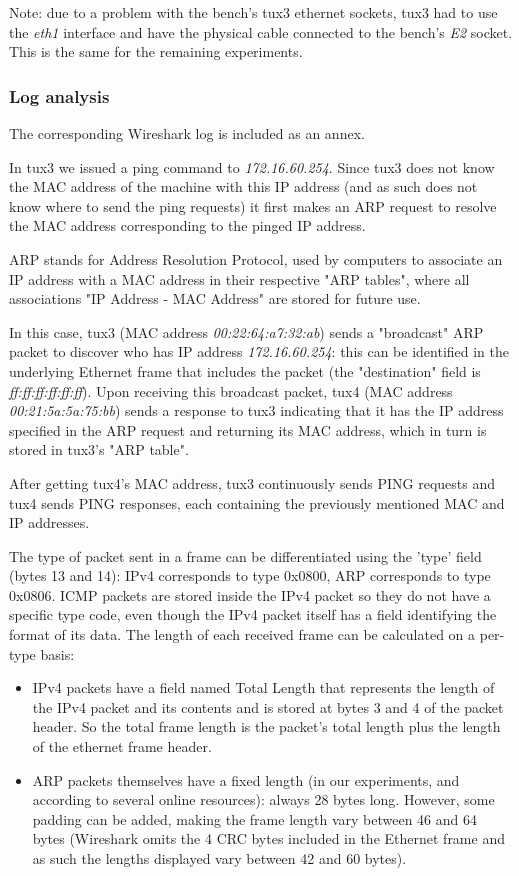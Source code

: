 \documentclass[11pt,a4paper,twocolumn]{article}
\begin{document}
Note: due to a problem with the bench's tux3 ethernet sockets, tux3 had to use the \textit{eth1} interface and have the physical cable connected to the bench's \textit{E2} socket. This is the same for the remaining experiments.
\subsubsection{Log analysis}

The corresponding Wireshark log is included as an annex.

In tux3 we issued a ping command to \textit{172.16.60.254}. Since tux3 does not know the MAC address of the machine with this IP address (and as such does not know where to send the ping requests) it first makes an ARP request to resolve the MAC address corresponding to the pinged IP address.

ARP stands for Address Resolution Protocol, used by computers to associate an IP address with a MAC address in their respective "ARP tables", where all associations "IP Address - MAC Address" are stored for future use.

In this case, tux3 (MAC address \textit{00:22:64:a7:32:ab}) sends a "broadcast" ARP packet to discover who has IP address \textit{172.16.60.254}: this can be identified in the underlying Ethernet frame that includes the packet (the "destination" field is \textit{ff:ff:ff:ff:ff:ff}).
Upon receiving this broadcast packet, tux4 (MAC address \textit{00:21:5a:5a:75:bb}) sends a response to tux3 indicating that it has the IP address specified in the ARP request and returning its MAC address, which in turn is stored in tux3's "ARP table".

After getting tux4's MAC address, tux3 continuously sends PING requests and tux4 sends PING responses, each containing the previously mentioned MAC and IP addresses.

The type of packet sent in a frame can be differentiated using the 'type' field (bytes 13 and 14): IPv4 corresponds to type 0x0800, ARP corresponds to type 0x0806. ICMP packets are stored inside the IPv4 packet so they do not have a specific type code, even though the IPv4 packet itself has a field identifying the format of its data.
The length of each received frame can be calculated on a per-type basis:
\begin{itemize}
    \item IPv4 packets have a field named Total Length that represents the length of the IPv4 packet and its contents and is stored at bytes 3 and 4 of the packet header. So the total frame length is the packet's total length plus the length of the ethernet frame header.
    \item ARP packets themselves have a fixed length (in our experiments, and according to several online resources): always 28 bytes long. However, some padding can be added, making the frame length vary between 46 and 64 bytes (Wireshark omits the 4 CRC bytes included in the Ethernet frame and as such the lengths displayed vary between 42 and 60 bytes).
\end{itemize}
\end{document}

